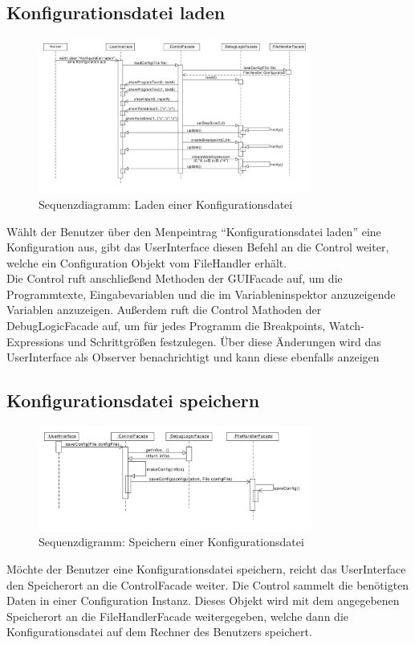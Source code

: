 \documentclass[parskip=full]{scrartcl}
\begin{document}
\newpage
\subsection{Konfigurationsdatei laden}
\begin{figure}[!h]
\centering
\includegraphics[width=0.8\textwidth]{diagrammIdeenUmlet/SequenceDiagrams/seq_loadConfigPDF.pdf}
\caption{Sequenzdiagramm:  Laden einer Konfigurationsdatei}
\end{figure}
Wählt der Benutzer über den Menpeintrag \enquote{Konfigurationsdatei laden} eine Konfiguration aus,
gibt das UserInterface diesen Befehl an die Control weiter, welche ein Configuration Objekt vom FileHandler 
erhält. \\
Die Control ruft anschließend Methoden der GUIFacade auf, um die Programmtexte, Eingabevariablen und
die im Variableninspektor anzuzeigende Variablen anzuzeigen. Außerdem ruft die Control
Mathoden der DebugLogicFacade auf, um für jedes Programm die Breakpoints, Watch-Expressions und
Schrittgrößen festzulegen. Über diese Änderungen wird das UserInterface als Observer benachrichtigt und
kann diese ebenfalls anzeigen

\newpage
\subsection{Konfigurationsdatei speichern}
\begin{figure}[!h]
\centering
\includegraphics[width=0.8\textwidth]{diagrammIdeenUmlet/SequenceDiagrams/seq_saveConfigPDF.pdf}
\caption{Sequenzdigramm: Speichern einer Konfigurationsdatei}
\end{figure}
Möchte der Benutzer eine Konfigurationsdatei speichern, reicht das UserInterface den Speicherort
an die ControlFacade weiter. Die Control sammelt die benötigten Daten in einer Configuration Instanz.
Dieses Objekt wird mit dem angegebenen Speicherort an die FileHandlerFacade weitergegeben, welche 
dann die Konfigurationsdatei auf dem Rechner des Benutzers speichert.
\end{document}
